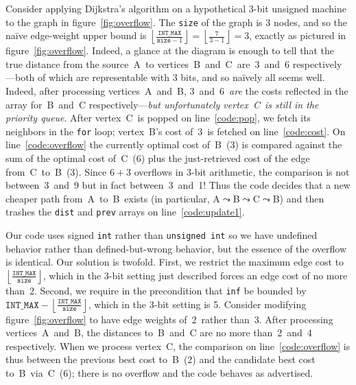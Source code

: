 Consider applying Dijkstra's algorithm on a hypothetical 3-bit unsigned machine to 
the graph in figure~\ref{fig:overflow}.  The \texttt{size} of the graph is 3 nodes, and so the na\"ive edge-weight upper bound is $\left\lfloor\frac{\texttt{INT\_MAX}}{\texttt{size}-1}\right\rfloor = \left\lfloor\frac{7}{3-1}\right\rfloor = 3$, exactly as pictured in figure~\ref{fig:overflow}.  Indeed, a glance at the diagram is enough to tell that the true distance from the source~A~to vertices~B~and~C~are~3~and~6 respectively---both of which are representable with 3 bits, and so na\"ively all seems well.  %
Indeed, after processing vertices~A~and~B, 3~and~6~\emph{are} the costs reflected in the  array for~B~and~C respectively---\emph{but unfortunately vertex~C~is still in the priority queue}.  After vertex~C~is popped on line~\ref{code:pop}, we fetch its neighbors in the \texttt{for} loop; vertex~B's cost of~3~is fetched on line~\ref{code:cost}.  On line~\ref{code:overflow} the currently optimal cost of~B~(3) is compared against the sum of the optimal cost of~C~(6) plus the just-retrieved cost of the edge from~C~to~B~(3).  Since $6+3$ overflows in 3-bit arithmetic, the comparison is not between~3~and~9 but in fact between~3~and~1!  Thus the code decides that a new cheaper path from~A~to~B~exists (in particular, A$\leadsto$B$\leadsto$C$\leadsto$B) and then trashes the \texttt{dist} and \texttt{prev} arrays on line~\ref{code:update1}.  %

Our code uses signed \texttt{int} rather than \texttt{unsigned int} so we have undefined behavior rather than defined-but-wrong behavior, but the essence of the overflow is identical.
Our solution is twofold.  First, we restrict the maximum edge cost to $\left\lfloor\frac{\texttt{INT\_MAX}}{\texttt{size}}\right\rfloor$, which in the 3-bit setting just described forces an edge cost of no more than~2.  Second, we require in the precondition that 
\texttt{inf} be bounded by $\texttt{INT\_MAX} - \left\lfloor \frac{\texttt{INT\_MAX}}{\texttt{size}} \right\rfloor$, which in the 3-bit setting is 5.  Consider modifying figure~\ref{fig:overflow} to
have edge weights of~2~rather than~3.  After processing vertices~A~and~B, the distances to~B~and~C are no more than~2~and~4 respectively.  When we process vertex~C, the comparison on line~\ref{code:overflow} is thus between the previous best cost to~B~(2) and the candidate best cost to~B~via~C~(6); there is no overflow and the code behaves as advertised.

